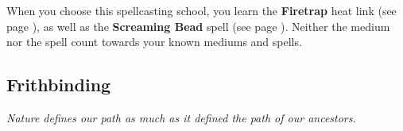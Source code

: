     When you choose this spellcasting school, you learn the \textbf{Firetrap} heat link (see page \pageref{medium::firetrap}), as well as the \textbf{Screaming Bead} spell (see page \pageref{spell::screamingbead}).
    Neither the medium nor the spell count towards your known mediums and spells.


\subsection*{Frithbinding} \label{ssec::frithbinding} %
    \textit{Nature defines our path as much as it defined the path of our ancestors.}

